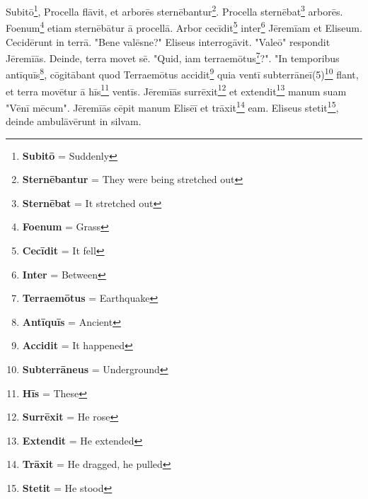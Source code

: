 Subitō\footnote{\textbf{Subitō} = Suddenly}, Procella flāvit, et arborēs sternēbantur\footnote{\textbf{Sternēbantur} = They were being stretched out}. Procella sternēbat\footnote{\textbf{Sternēbat} = It stretched out} arborēs. Foenum\footnote{\textbf{Foenum} = Grass} etiam sternēbātur ā procellā. Arbor cecīdit\footnote{\textbf{Cecīdit} = It fell} inter\footnote{\textbf{Inter} = Between} Jēremīam et Eliseum. Cecidērunt in terrā. "Bene valēsne?" Eliseus interrogāvit. "Valeō" respondit Jēremīās.  Deinde, terra movet sē. "Quid, iam terraemōtus\footnote{\textbf{Terraemōtus} = Earthquake}?". "In temporibus antīquīs\footnote{\textbf{Antīquīs} = Ancient}, cōgitābant quod Terraemōtus accidit\footnote{\textbf{Accidit} = It happened} quia ventī subterrāneī(5)\footnote{\textbf{Subterrāneus} = Underground} flant, et terra movētur ā hīs\footnote{\textbf{Hīs} = These} ventīs. Jēremīās surrēxit\footnote{\textbf{Surrēxit} = He rose} et extendit\footnote{\textbf{Extendit} = He extended} manum suam "Vēnī mēcum". Jēremīās cēpit manum Elisēī et trāxit\footnote{\textbf{Trāxit} = He dragged, he pulled} eam. Eliseus stetit\footnote{\textbf{Stetit} = He stood}, deinde ambulāvērunt in silvam.